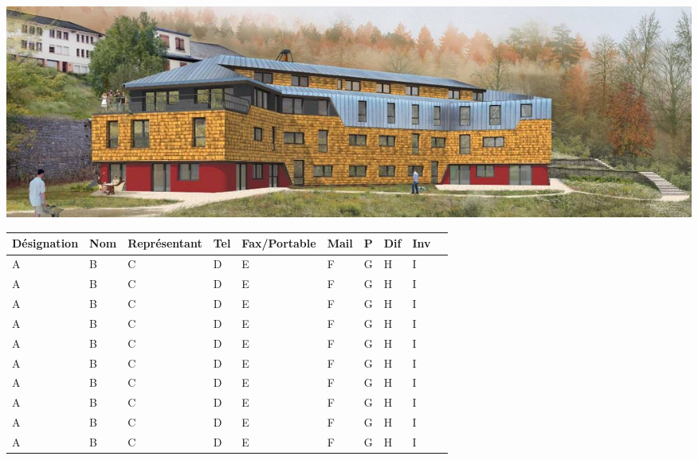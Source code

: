 
\begin{center}
\includegraphics[width=.8\textwidth]{TAVAILLON_3D}
\end{center}

\begin{center}
\tiny

\begin{tabular}{|p{2.92cm}|p{2cm}|p{1.5cm}|p{1.5cm}|p{1.5cm}|p{2cm}|p{.3cm}|p{.3cm}|p{.3cm}|p{.3cm}|}
\hline
   Désignation & Nom & Représentant & Tel & Fax/Portable & Mail & P & Dif & Inv & \\
\hline
\hline
   A & B & C & D & E & F & G & H & I & \\
\hline
   A & B & C & D & E & F & G & H & I & \\
\hline
   A & B & C & D & E & F & G & H & I & \\
\hline
   A & B & C & D & E & F & G & H & I & \\
\hline
   A & B & C & D & E & F & G & H & I & \\
\hline
   A & B & C & D & E & F & G & H & I & \\
\hline
   A & B & C & D & E & F & G & H & I & \\
\hline
   A & B & C & D & E & F & G & H & I & \\
\hline
   A & B & C & D & E & F & G & H & I & \\
\hline
   A & B & C & D & E & F & G & H & I & \\
\hline
\end{tabular}


\end{center}
